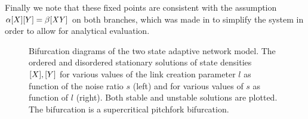 Finally we note that these fixed points are consistent with the assumption $\alpha[X][Y] = \beta\mathit{[XY]}$ on both branches, which was made in \cite{Chen2016} to simplify the system in order to allow for analytical evaluation.

\begin{figure}[htp]
	\centering
	\caption{Bifurcation diagrams of the two state adaptive network model. The ordered and disordered stationary solutions of state densities $[X], [Y]$ for various values of the link creation parameter $l$ as function of the noise ratio $s$ (left) and for various values of $s$ as function of $l$ (right). Both stable and unstable solutions are plotted. The bifurcation is a supercritical pitchfork bifurcation.}
	\label{fig:bifurcation_zerothM}
\end{figure}

